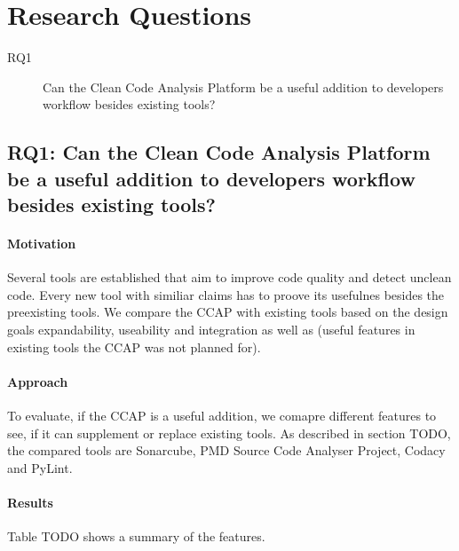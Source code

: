 \section{Research Questions}

\begin{description}
    \item[RQ1] Can the Clean Code Analysis Platform be a useful addition to developers workflow besides existing tools? 
\end{description}

\subsection{RQ1: Can the Clean Code Analysis Platform be a useful addition to developers workflow besides existing tools?}
\paragraph{Motivation}
Several tools are established that aim to improve code quality and detect unclean code. Every new tool with similiar claims has to proove its usefulnes besides the preexisting tools. We compare the CCAP with existing tools based on the design goals expandability, useability and integration as well as (useful features in existing tools the CCAP was not planned for).
\paragraph{Approach}
To evaluate, if the CCAP is a useful addition, we comapre different features to see, if it can supplement or replace existing tools. As described in section TODO, the compared tools are Sonarcube, PMD Source Code Analyser Project, Codacy and PyLint.

\paragraph{Results}
Table TODO shows a summary of the features.